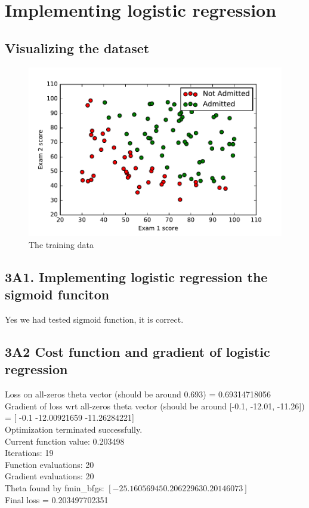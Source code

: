 \documentclass[pdftex,11pt]{article}
\begin{document}
\section{Implementing logistic regression}
\subsection{Visualizing the dataset}

\begin{figure}[H]
  \caption{The training data}
  \centering
    \includegraphics[scale=0.5]{fig1.pdf}
\end{figure}

\subsection{3A1. Implementing logistic regression the sigmoid funciton}
Yes we had tested sigmoid function, it is correct.
\subsection{3A2 Cost function and gradient of logistic regression}
Loss on all-zeros theta vector (should be around 0.693) =  0.69314718056\\
Gradient of loss wrt all-zeros theta vector (should be around [-0.1, -12.01, -11.26]) =  [ -0.1        -12.00921659 -11.26284221]\\
Optimization terminated successfully.\\
         Current function value: 0.203498\\
         Iterations: 19\\
         Function evaluations: 20\\
         Gradient evaluations: 20\\
Theta found by fmin\_bfgs:  $[-25.16056945   0.20622963   0.20146073]$\\
Final loss =  0.203497702351\\
\end{document}
